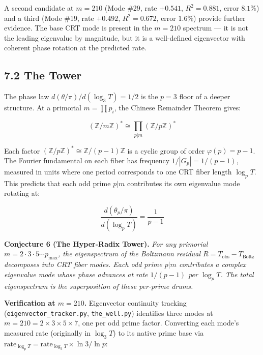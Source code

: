 \documentclass[
  11pt,
]{article}
\numberwithin{equation}{section}
\begin{document}
A second candidate at \(m = 210\) (Mode \#29, rate \(+0.541\),
\(R^2 = 0.881\), error \(8.1\%\)) and a third (Mode \#19, rate
\(+0.492\), \(R^2 = 0.672\), error \(1.6\%\)) provide further evidence.
The base CRT mode is present in the \(m = 210\) spectrum --- it is not
the leading eigenvalue by magnitude, but it is a well-defined
eigenvector with coherent phase rotation at the predicted rate.

\subsection{7.2 The Tower}\label{the-tower}

The phase law \(d(\theta/\pi)/d(\log_3 T) = 1/2\) is the \(p = 3\) floor
of a deeper structure. At a primorial \(m = \prod p_i\), the Chinese
Remainder Theorem gives:

\begin{equation}(\mathbb{Z}/m\mathbb{Z})^* \cong \prod_{p | m} (\mathbb{Z}/p\mathbb{Z})^*\end{equation}

Each factor
\((\mathbb{Z}/p\mathbb{Z})^* \cong \mathbb{Z}/(p{-}1)\mathbb{Z}\) is a
cyclic group of order \(\varphi(p) = p - 1\). The Fourier fundamental on
each fiber has frequency \(1/|G_p| = 1/(p-1)\), measured in units where
one period corresponds to one CRT fiber length \(\log_p T\). This
predicts that each odd prime \(p | m\) contributes its own eigenvalue
mode rotating at:

\begin{equation}\boxed{\frac{d(\theta_p/\pi)}{d(\log_p T)} = \frac{1}{p - 1}}\end{equation}

\textbf{Conjecture 6 (The Hyper-Radix Tower).} \emph{For any primorial
\(m = 2 \cdot 3 \cdot 5 \cdots p_{\max}\), the eigenspectrum of the
Boltzmann residual \(R = T_{\text{obs}} - T_{\text{Boltz}}\) decomposes
into CRT fiber modes. Each odd prime \(p | m\) contributes a complex
eigenvalue mode whose phase advances at rate \(1/(p-1)\) per
\(\log_p T\). The total eigenspectrum is the superposition of these
per-prime drums.}

\textbf{Verification at \(m = 210\).} Eigenvector continuity tracking
(\texttt{eigenvector\_tracker.py}, \texttt{the\_well.py}) identifies
three modes at \(m = 210 = 2 \times 3 \times 5 \times 7\), one per odd
prime factor. Converting each mode's measured rate (originally in
\(\log_3 T\)) to its native prime base via
\(\text{rate}_{\log_p T} = \text{rate}_{\log_3 T} \times \ln 3 / \ln p\):
\end{document}
